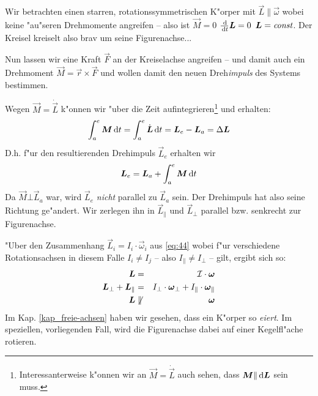 Wir betrachten einen starren, rotationssymmetrischen K"orper mit $\vec
L \| \vec \omega$ wobei keine "au"seren Drehmomente angreifen -- also
ist $\vec M = 0$ \Impl $\frac{\, \mathrm{d} }{\, \mathrm{d} t} \boldsymbol{L} = 0$ \Impl $\boldsymbol{L} = \text{\emph{const}}$. Der Kreisel kreiselt also brav um seine Figurenachse...


Nun lassen wir eine Kraft $\vec F$ an der Kreiselachse angreifen --
und damit auch ein Drehmoment $\vec M = \vec r \times \vec F$ und
wollen damit den neuen Dreh\emph{impuls} des Systems bestimmen.

Wegen $\vec M = \dot{\vec L}$ k"onnen wir "uber die Zeit
aufintegrieren\footnote{Interessanterweise k"onnen wir an $\vec M =
  \dot{\vec L}$ auch sehen, dass $\boldsymbol{M} \| \, \mathrm{d} \boldsymbol{L}$ sein muss.} und erhalten:
\begin{equation}
   \label{eq:49}
   \int_a^e \boldsymbol{M} \, \mathrm{d} t = \int_a^e \dot{\boldsymbol{L}} \, \mathrm{d} t = \boldsymbol{L}_e
   - \boldsymbol{L}_a = \Delta \boldsymbol{L}
\end{equation}
D.h. f"ur den resultierenden Drehimpuls $\vec L_e$ erhalten wir
\begin{equation}
   \label{eq:50}
   \boldsymbol{L}_e = \boldsymbol{L}_a + \int_a^e \boldsymbol{M} \, \mathrm{d} t
\end{equation}
Da $\vec M \bot \vec L_a$ war, wird $\vec L_e$ \emph{nicht} parallel
zu $\vec L_a$ sein. Der Drehimpuls hat also seine Richtung
ge"andert. Wir zerlegen ihn in $\vec L_\|$ und $\vec L_\bot$ parallel
bzw. senkrecht zur Figurenachse.

"Uber den Zusammenhang $\vec L_i = I_i \cdot \vec \omega_i$ aus
\eqref{eq:44} wobei f"ur verschiedene Rotationsachsen in diesem Falle
$I_i \neq I_j$ -- also $I_\| \neq I_\bot$ -- gilt, ergibt sich so:
\begin{eqnarray}
\nonumber
   \boldsymbol{L} &=& {\mathcal{I}} \cdot \boldsymbol{\omega} \\
\nonumber
   \boldsymbol{L}_\bot + \boldsymbol{L}_\| &=& I_\bot \cdot \boldsymbol{\omega}_\bot + I_\|
   \cdot \boldsymbol{\omega}_\| \\
   \boldsymbol{L} &\not \parallel & \boldsymbol{\omega}
   \label{eq:51}
\end{eqnarray}
Im Kap. \ref{kap_freie-achsen} haben wir gesehen, dass ein K"orper so
\emph{eiert}. Im speziellen, vorliegenden Fall, wird die Figurenachse
dabei auf einer Kegelfl"ache rotieren.



